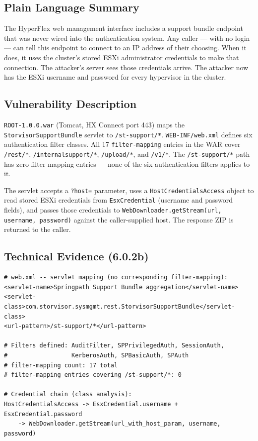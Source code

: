 \documentclass[11pt,a4paper]{article}
\begin{document}
\subsection*{Plain Language Summary}

The HyperFlex web management interface includes a support bundle endpoint that
was never wired into the authentication system. Any caller --- with no login ---
can tell this endpoint to connect to an IP address of their choosing. When it
does, it uses the cluster's stored ESXi administrator credentials to make that
connection. The attacker's server sees those credentials arrive. The attacker
now has the ESXi username and password for every hypervisor in the cluster.

\subsection*{Vulnerability Description}

\texttt{ROOT-1.0.0.war} (Tomcat, HX Connect port 443) maps the
\texttt{StorvisorSupportBundle} servlet to \texttt{/st-support/*}.
\texttt{WEB-INF/web.xml} defines six authentication filter classes.
All 17 \texttt{filter-mapping} entries in the WAR cover \texttt{/rest/*},
\texttt{/internalsupport/*}, \texttt{/upload/*}, and \texttt{/v1/*}.
The \texttt{/st-support/*} path has zero filter-mapping entries --- none of the
six authentication filters applies to it.

The servlet accepts a \texttt{?host=} parameter, uses a
\texttt{HostCredentialsAccess} object to read stored ESXi credentials from
\texttt{EsxCredential} (username and password fields), and passes those
credentials to \texttt{WebDownloader.getStream(url, username, password)} against
the caller-supplied host. The response ZIP is returned to the caller.

\subsection*{Technical Evidence (6.0.2b)}

\begin{lstlisting}
# web.xml -- servlet mapping (no corresponding filter-mapping):
<servlet-name>Springpath Support Bundle aggregation</servlet-name>
<servlet-class>com.storvisor.sysmgmt.rest.StorvisorSupportBundle</servlet-class>
<url-pattern>/st-support/*</url-pattern>

# Filters defined: AuditFilter, SPPrivilegedAuth, SessionAuth,
#                  KerberosAuth, SPBasicAuth, SPAuth
# filter-mapping count: 17 total
# filter-mapping entries covering /st-support/*: 0

# Credential chain (class analysis):
HostCredentialsAccess -> EsxCredential.username + EsxCredential.password
    -> WebDownloader.getStream(url_with_host_param, username, password)
\end{lstlisting}
\end{document}
